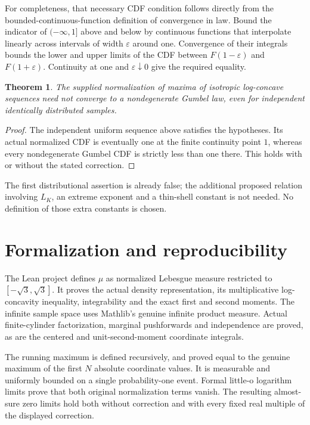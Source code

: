 \documentclass[11pt]{article}
\newtheorem{theorem}{Theorem}
\begin{document}
For completeness, that necessary CDF condition follows
directly from the bounded-continuous-function definition
of convergence in law. Bound the indicator of
$(-\infty,1]$ above and below by continuous functions
that interpolate linearly across intervals of width
$\varepsilon$ around one. Convergence of their integrals
bounds the lower and upper limits of the CDF between
$F(1-\varepsilon)$ and $F(1+\varepsilon)$.
Continuity at one and $\varepsilon\downarrow0$ give
the required equality.

\begin{theorem}
The supplied normalization of maxima of isotropic
log-concave sequences need not converge to a
nondegenerate Gumbel law, even for independent
identically distributed samples.
\end{theorem}
\begin{proof}
The independent uniform sequence above satisfies the
hypotheses. Its actual normalized CDF is eventually
one at the finite continuity point $1$, whereas every
nondegenerate Gumbel CDF is strictly less than one
there. This holds with or without the stated correction.
\end{proof}
The first distributional assertion is already false;
the additional proposed relation involving $L_K$,
an extreme exponent and a thin-shell constant is not
needed. No definition of those extra constants is chosen.

\newpage
\section*{Formalization and reproducibility}
The Lean project defines $\mu$ as normalized Lebesgue
measure restricted to $[-\sqrt3,\sqrt3]$. It proves the
actual density representation, its multiplicative
log-concavity inequality, integrability and the exact
first and second moments. The infinite sample space
uses Mathlib's genuine infinite product measure.
Actual finite-cylinder factorization, marginal
pushforwards and independence are proved, as are
the centered and unit-second-moment coordinate integrals.

The running maximum is defined recursively, and proved
equal to the genuine maximum of the first $N$ absolute
coordinate values. It is measurable and uniformly
bounded on a single probability-one event. Formal
little-o logarithm limits prove that both original
normalization terms vanish. The resulting almost-sure
zero limits hold both without correction and with
every fixed real multiple of the displayed correction.
\end{document}
